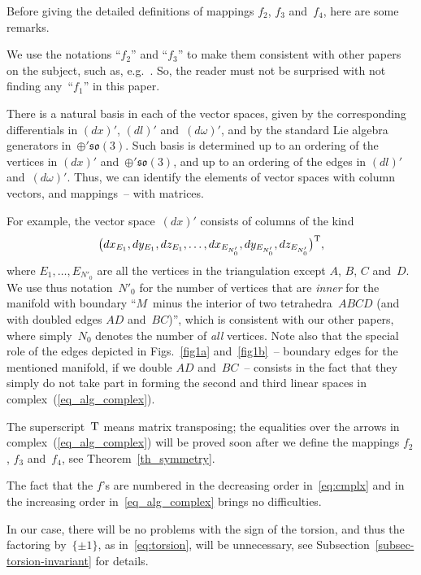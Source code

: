 \documentclass[pdftex]{sigma}
\begin{document}
Before giving the detailed def\/initions of mappings $f_2$, $f_3$ and~$f_4$, here are some remarks.
\begin{remark}
We use the notations ``$f_2$'' and ``$f_3$'' to make them consistent with other papers on the subject, such as, e.g.~\cite{M,M-thesis}. So, the reader must not be surprised with not f\/inding any~``$f_1$'' in this paper.
\end{remark}
\begin{remark}
\label{rem-b}
There is a natural basis in each of the vector spaces, given by the corresponding dif\/ferentials in $(dx)'$, $(dl)'$ and~$(d\omega)'$, and by the standard Lie algebra generators in~$\oplus' \mathfrak{so}(3)$. Such basis is determined up to an ordering of the vertices in $(dx)'$ and~$\oplus' \mathfrak{so}(3)$, and up to an ordering of the edges in $(dl)'$ and~$(d\omega)'$. Thus, we can identify the elements of vector spaces with column vectors, and mappings~-- with matrices.

For example, the vector space~$(dx)'$ consists of columns of the kind
\begin{displaymath}
\big(dx_{E_1}, dy_{E_1}, dz_{E_1}, \ldots, dx_{E_{N'_0}}, dy_{E_{N'_0}}, dz_{E_{N'_0}}\big)^{\rm T},
\end{displaymath}
where $E_1,\ldots,E_{N'_0}$ are all the vertices in the triangulation except $A$, $B$, $C$ and~$D$. We use thus notation~$N'_0$ for the number of vertices that are \emph{inner} for the manifold with boundary ``$M$~minus the interior of two tetrahedra~$ABCD$ (and with doubled edges $AD$ and~$BC$)'', which is consistent with our other papers, where simply~$N_0$ denotes the number of \emph{all} vertices. Note also that the special role of the edges depicted in Figs.~\ref{fig1a} and~\ref{fig1b}~-- boundary edges for the mentioned manifold, if we double $AD$ and~$BC$~-- consists in the fact that they simply do not take part in forming the second and third linear spaces in complex~(\ref{eq_alg_complex}).
\end{remark}
\begin{remark}
The superscript~$\rm T$ means matrix transposing; the equalities over the arrows in complex~(\ref{eq_alg_complex}) will be proved soon after we def\/ine the mappings $f_2$, $f_3$ and~$f_4$, see Theorem~\ref{th_symmetry}.
\end{remark}
\begin{remark}
The fact that the $f$'s are numbered in the decreasing order in~\eqref{eq:cmplx} and in the increasing order in~\eqref{eq_alg_complex} brings no dif\/f\/iculties.
\end{remark}
\begin{remark}
In our case, there will be no problems with the sign of the torsion, and thus the factoring by~$\{ \pm 1 \}$, as in~\eqref{eq:torsion}, will be unnecessary, see Subsection~\ref{subsec-torsion-invariant} for details.
\end{remark}
\end{document}
